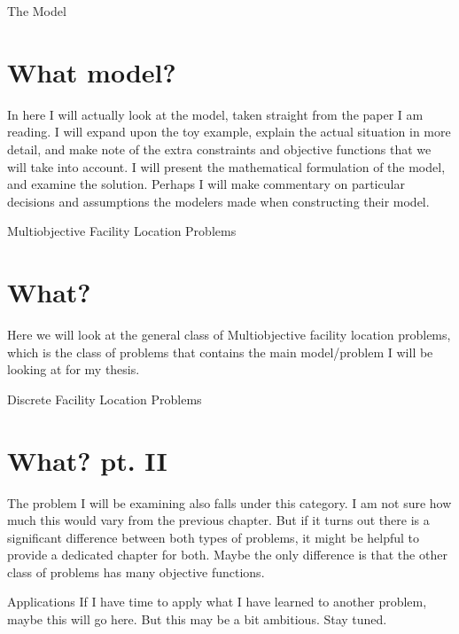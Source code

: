 \documentclass[12pt]{pom_thesis}
\begin{document}
\begin{chapter}{The Model}
\section{What model?}
In here I will actually look at the model, taken straight from the paper I am reading. I will expand upon the toy example, explain the actual situation in more detail, and make note of the extra constraints and objective functions that we will take into account. I will present the mathematical formulation of the model, and examine the solution. Perhaps I will make commentary on particular decisions and assumptions the modelers made when constructing their model.
\end{chapter}

\begin{chapter}{Multiobjective Facility Location Problems}
\section{What?}
Here we will look at the general class of Multiobjective facility location problems, which is the class of problems that contains the main model/problem I will be looking at for my thesis. 
\end{chapter}

\begin{chapter}{Discrete Facility Location Problems}
\section{What? pt. II}
The problem I will be examining also falls under this category. I am not sure how much this would vary from the previous chapter. But if it turns out there is a significant difference between both types of problems, it might be helpful to provide a dedicated chapter for both. Maybe the only difference is that the other class of problems has many objective functions.
\end{chapter}

\begin{chapter}{Applications}
If I have time to apply what I have learned to another problem, maybe this will go here. But this may be a bit ambitious. Stay tuned.
\end{chapter}
\end{document}
